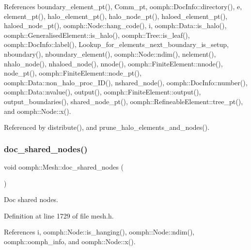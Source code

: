References boundary\+\_\+element\+\_\+pt(), Comm\+\_\+pt, oomph\+::\+Doc\+Info\+::directory(), e, element\+\_\+pt(), halo\+\_\+element\+\_\+pt(), halo\+\_\+node\+\_\+pt(), haloed\+\_\+element\+\_\+pt(), haloed\+\_\+node\+\_\+pt(), oomph\+::\+Node\+::hang\+\_\+code(), i, oomph\+::\+Data\+::is\+\_\+halo(), oomph\+::\+Generalised\+Element\+::is\+\_\+halo(), oomph\+::\+Tree\+::is\+\_\+leaf(), oomph\+::\+Doc\+Info\+::label(), Lookup\+\_\+for\+\_\+elements\+\_\+next\+\_\+boundary\+\_\+is\+\_\+setup, nboundary(), nboundary\+\_\+element(), oomph\+::\+Node\+::ndim(), nelement(), nhalo\+\_\+node(), nhaloed\+\_\+node(), nnode(), oomph\+::\+Finite\+Element\+::nnode(), node\+\_\+pt(), oomph\+::\+Finite\+Element\+::node\+\_\+pt(), oomph\+::\+Data\+::non\+\_\+halo\+\_\+proc\+\_\+\+I\+D(), nshared\+\_\+node(), oomph\+::\+Doc\+Info\+::number(), oomph\+::\+Data\+::nvalue(), output(), oomph\+::\+Finite\+Element\+::output(), output\+\_\+boundaries(), shared\+\_\+node\+\_\+pt(), oomph\+::\+Refineable\+Element\+::tree\+\_\+pt(), and oomph\+::\+Node\+::x().



Referenced by distribute(), and prune\+\_\+halo\+\_\+elements\+\_\+and\+\_\+nodes().

\mbox{\label{classoomph_1_1Mesh_ab0eea1a0cdb71ef73ffcd878c067d269}} 
\subsubsection{\texorpdfstring{doc\+\_\+shared\+\_\+nodes()}{doc\_shared\_nodes()}}
{\footnotesize\ttfamily void oomph\+::\+Mesh\+::doc\+\_\+shared\+\_\+nodes (\begin{DoxyParamCaption}{ }\end{DoxyParamCaption})\hspace{0.3cm}{\ttfamily [inline]}}



Doc shared nodes. 



Definition at line 1729 of file mesh.\+h.



References i, oomph\+::\+Node\+::is\+\_\+hanging(), oomph\+::\+Node\+::ndim(), oomph\+::oomph\+\_\+info, and oomph\+::\+Node\+::x().

